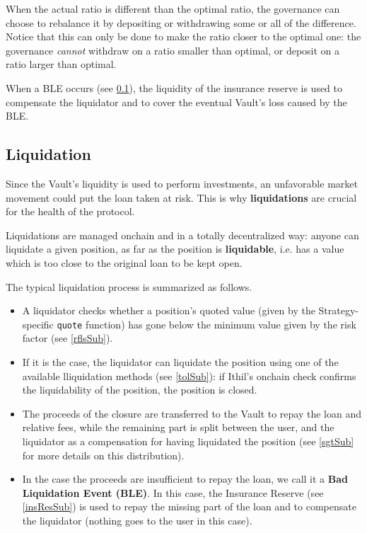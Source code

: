 \documentclass[a4paper,10 pt]{article}
\theoremstyle{definition}
\begin{document}
When the actual ratio is different than the optimal ratio, the governance can choose to rebalance it by depositing or withdrawing some or all of the difference. Notice that this can only be done to make the ratio closer to the optimal one: the governance {\it cannot} withdraw on a ratio smaller than optimal, or deposit on a ratio larger than optimal.

When a BLE occurs (see \ref{liqSub0}), the liquidity of the insurance reserve is used to compensate the liquidator and to cover the eventual Vault's loss caused by the BLE.

\subsection{Liquidation}\label{liqSub0}
Since the Vault's liquidity is used to perform investments, an unfavorable market movement could put the loan taken at risk. This is why {\bf liquidations} are crucial for the health of the protocol.

Liquidations are managed onchain and in a totally decentralized way: anyone can liquidate a given position, as far as the position is {\bf liquidable}, i.e. has a value which is too close to the original loan to be kept open.

The typical liquidation process is summarized as follows.
\begin{itemize}
\item A liquidator checks whether a position's quoted value (given by the Strategy-specific \verb|quote| function) has gone below the minimum value given by the risk factor (see \ref{rflsSub}).
\item If it is the case, the liquidator can liquidate the position using one of the available lliquidation methods (see \ref{tolSub}): if Ithil's onchain check confirms the liquidability of the position, the position is closed.
\item The proceeds of the closure are transferred to the Vault to repay the loan and relative fees, while the remaining part is split between the user, and the liquidator as a compensation for having liquidated the position (see \ref{sgtSub} for more details on this distribution).
\item In the case the proceeds are insufficient to repay the loan, we call it a {\bf Bad Liquidation Event (BLE)}. In this case, the Insurance Reserve (see \ref{insResSub}) is used to repay the missing part of the loan and to compensate the liquidator (nothing goes to the user in this case).
\end{itemize}
\end{document}
